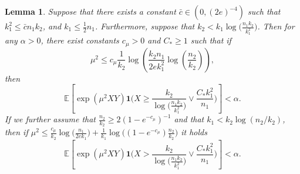 \documentclass{article}
\newcommand{\EE}{\mathbb{E}}
\newcommand{\one}{\mathbf{1}}
\newcommand{\Ct}{C_{*}}
\newtheorem{lemma}{Lemma}
\begin{document}
\begin{lemma}\label{lem_max_test_lower_bound}
    Suppose that there exists a constant $\bar{c} \in (0,(2e)^{-4})$ such that $k_1^2 \leq \bar{c}n_1k_2$, and $k_1 \leq \frac12n_1$. 
    Furthermore, suppose that $k_2 < k_1\log\big(\frac{n_1k_2}{k_1^2}\big)$. Then for any $\alpha > 0$, there exist  constants $c_\mu > 0$ and $C_* \geq 1$ such that if 
    $$\mu^2 \leq c_\mu\frac{1}{k_2}\log\left(\frac{k_2n_1}{2ek_1^2} \log\left(\frac{n_2}{k_2}\right)\right),$$
    then 
    \[\EE\left[\exp(\mu^2XY)\one\Big(X \geq \frac{k_2}{\log\big(\frac{n_1k_2}{k_1^2}\big)}\vee   \frac{\Ct k_1^2}{n_1}\Big)\right] < \alpha.\]
    If we further assume that $\frac{n_2}{k_2} \geq 2(1 - e^{-c_\mu})^{-1}$ and that $k_1 < k_2\log(n_2/k_2)$, then if $\mu^2 \leq \frac{c_\mu}{k_2}\log\big(\frac{n_1}{2ek_1}\big) + \frac{1}{k_1}\log\big((1-e^{-c_\mu})\frac{n_2}{k_2}\big)$ it holds
\[\EE\left[\exp(\mu^2XY)\one\Big(X > \frac{k_2}{\log\big(\frac{n_1k_2}{k_1^2}\big)}\vee   \frac{\Ct k_1^2}{n_1}\Big)\right] < \alpha.\]
\end{lemma}
\end{document}
